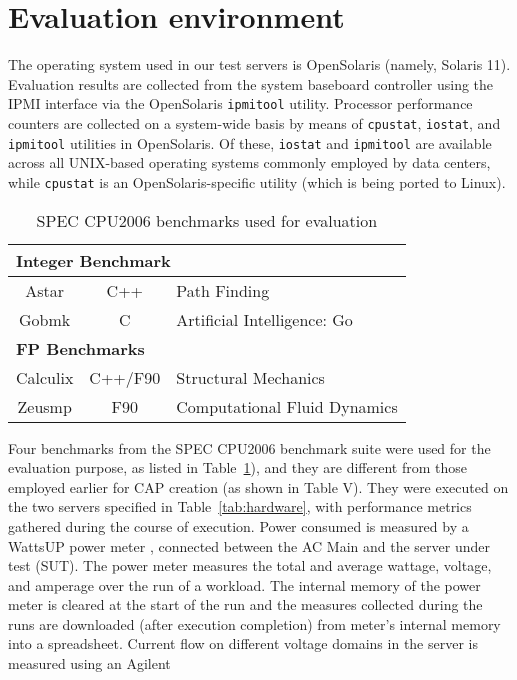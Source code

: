 \section{Evaluation environment}
\label{sec:measurementtools}
The operating system used in our test servers is OpenSolaris (namely,
Solaris 11).  Evaluation results are collected from the system baseboard
controller using the IPMI interface via the OpenSolaris
\texttt{ipmitool} utility.  Processor performance counters are collected
on a system-wide basis by means of \texttt{cpustat}, \texttt{iostat},
and \texttt{ipmitool} utilities in OpenSolaris.  Of these,
\texttt{iostat} and \texttt{ipmitool} are available across all
UNIX-based operating systems commonly employed by data centers, while
\texttt{cpustat} is an OpenSolaris-specific utility (which is being
ported to Linux).
\begin{table}[tbp]
  \centering
  \caption{SPEC CPU2006 benchmarks used for evaluation}
  \label{tab:addspec}
  \begin{tabular}{c c p{5cm}}
    \hline
    \multicolumn{3}{l}{\textbf{Integer Benchmark}} \\
    \hline
    Astar&C++&Path Finding\\
    Gobmk&C&Artificial Intelligence: Go\\
    \multicolumn{3}{l}{\textbf{FP Benchmarks}} \\
    \hline
    Calculix&C++/F90&Structural Mechanics\\
    Zeusmp&F90&Computational Fluid Dynamics\\
    \hline
  \end{tabular}
\end{table}
Four benchmarks from the SPEC CPU2006 benchmark suite were used for the
evaluation purpose, as listed in Table~\ref{tab:addspec}), and they are
different from those employed earlier for CAP creation (as shown in
Table V).  They were executed on the two servers specified in
Table~\ref{tab:hardware}, with performance metrics gathered during the
course of execution.  Power consumed is measured by a WattsUP power meter
\cite{WattsUp2006a}, connected between the AC Main and the server under
test (SUT).  The power meter measures the total and average wattage,
voltage, and amperage over the run of a workload.  The internal memory
of the power meter is cleared at the start of the run and the measures
collected during the runs are downloaded (after execution completion)
from meter's internal memory into a spreadsheet.  Current flow on
different voltage domains in the server is measured using an Agilent
